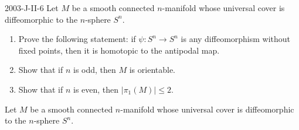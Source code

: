 \documentclass{article}
\begin{document}
	\begin{prb}{2003-J-II-6}
		Let $M$ be a smooth connected $n$-manifold whose universal cover is diffeomorphic to the $n$-sphere $S^{n}$. \vspace{-0.25cm}
		\begin{enumerate}[itemsep =-2pt,label = (\alph{*})]
			\item Prove the following statement: if $\psi: S^{n} \to S^{n}$ is any diffeomorphism without fixed points, then it is homotopic to the antipodal map. 
			\item Show that if $n$ is odd, then $M$ is orientable. 
			\item Show that if $n$ is even, then $|\pi_{1}(M)| \leq 2$.
		\end{enumerate}
	\end{prb}
	Let $M$ be a smooth connected $n$-manifold whose universal cover is diffeomorphic to the $n$-sphere $S^n$. \vspace{-0.25cm}
\end{document}
